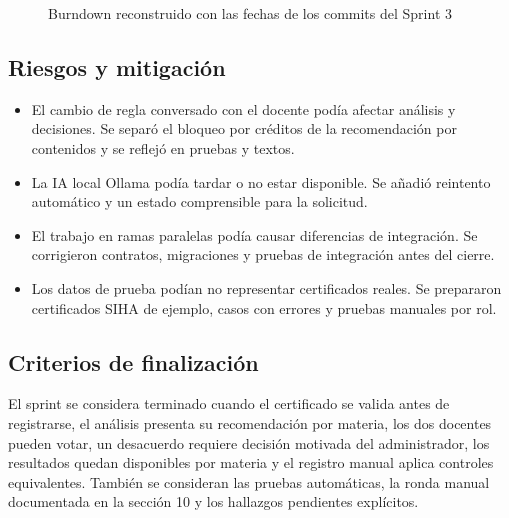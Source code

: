 \begin{figure}[H]\centering
{}
\caption{Burndown reconstruido con las fechas de los commits del Sprint 3}
\end{figure}

\subsection{Riesgos y mitigación}
\begin{itemize}
\item El cambio de regla conversado con el docente podía afectar análisis y decisiones. Se separó el bloqueo por créditos de la recomendación por contenidos y se reflejó en pruebas y textos.
\item La IA local Ollama podía tardar o no estar disponible. Se añadió reintento automático y un estado comprensible para la solicitud.
\item El trabajo en ramas paralelas podía causar diferencias de integración. Se corrigieron contratos, migraciones y pruebas de integración antes del cierre.
\item Los datos de prueba podían no representar certificados reales. Se prepararon certificados SIHA de ejemplo, casos con errores y pruebas manuales por rol.
\end{itemize}

\subsection{Criterios de finalización}
El sprint se considera terminado cuando el certificado se valida antes de registrarse, el análisis presenta su recomendación por materia, los dos docentes pueden votar, un desacuerdo requiere decisión motivada del administrador, los resultados quedan disponibles por materia y el registro manual aplica controles equivalentes. También se consideran las pruebas automáticas, la ronda manual documentada en la sección 10 y los hallazgos pendientes explícitos.
